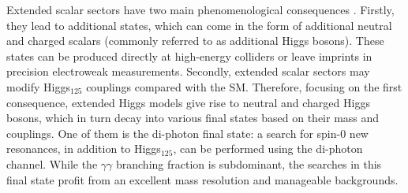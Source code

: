\documentclass[a4paper, oneside, 11pt, openright]{book}
\begin{document}
		
		Extended scalar sectors have two main phenomenological consequences \cite{ext_higgs}\cite{Englert_2014}. Firstly, they lead to additional states, which can come in the form of additional neutral and charged scalars (commonly referred to as additional Higgs bosons). These states can be produced directly at high-energy colliders or leave imprints in precision electroweak measurements. Secondly, extended scalar sectors may modify Higgs$_{125}$ couplings compared with the SM. Therefore, focusing on the first consequence, extended Higgs models give rise to neutral and charged Higgs bosons, which in turn decay into various final states based on their mass and couplings. One of them is the di-photon final state: a search for spin-0 new resonances, in addition to Higgs$_{125}$, can be performed using the di-photon channel. While the $\gamma\gamma$ branching fraction is subdominant, the searches in this final state profit from an excellent mass resolution and manageable backgrounds. 
		
\end{document}
